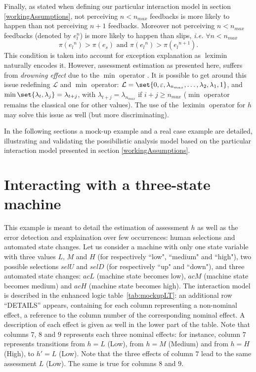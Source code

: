 Finally, as stated when defining our particular interaction model in
section \ref{workingAssumptions}, 
not perceiving  $n<n_{max}$ feedbacks is more likely to happen 
than not perceiving $n+1$ feedbacks. 
Moreover not perceiving $n<n_{max}$ feedbacks (denoted by $e_l^n$)
is more likely to happen than slips, 
\textit{i.e.} $\forall n<n_{max}$ %
\[ \pi({e_l}^n) > \pi(e_s) \mbox{ and } \pi({e_l}^n) > \pi({e_l}^{n+1}). \]
This condition is taken into account for exception explanation 
as $\operatorname*{leximin}$ naturally encodes it. 
However, assessment estimation as presented here, 
suffers from \textit{drowning effect} 
due to the $\min$ operator \cite{Dubois05b}.
It is possible to get around this issue 
redefining $\mathcal{L}$ and $\min$ operator: 
$\mathcal{L} = \set{ 0, \varepsilon, \lambda_{n_{max}},\ldots,\lambda_2, \lambda_1,1}$, 
and $\min \set{ \lambda_t, \lambda_j } = \lambda_{t+j} $, 
with $\lambda_{t+j} = \lambda_{n_{max}}$ 
if $i+j \geqslant n_{max}$ 
($\min$ operator remains the classical one for other values).
The use of the $\operatorname*{leximin}$ operator for $h$ may solve this issue as well 
(but more discriminating).

In the following sections a mock-up example 
and a real case example are detailed, 
illustrating and validating the
possibilistic analysis model based on
the particular interaction model presented in
section \ref{workingAssumptions}.

\section{Interacting with a three-state machine}
\label{sec:mockup}

This example is meant to detail the estimation of assessment $h$
as well as the error detection and explaination 
over few occurrences:
human selections and automated state changes. 
Let us consider a machine with only one state variable 
with three values $L$, $M$ and $H$ 
(for respectively ``low", ``medium" and ``high"), 
two possible selections $selU$ and $selD$ 
(for respectively ``up" and ``down"), 
and three automated state changes: 
$acL$ (machine state becomes low), 
$acM$ (machine state becomes medium) 
and $acH$ (machine state becomes high). 
The interaction model is described in the enhanced logic table~\ref{tab:mockupLT}: 
an additional row ``DETAILS'' appears, 
containing for each column representing
a non-nominal effect,
a reference to the column number of the corresponding nominal effect.
A description of each effect is given as well in the lower part of the table.
Note that columns $7$, $8$ and $9$ represents each three nominal effects:
for instance, column $7$ represents transitions from $h=L$ (Low), 
from $h=M$ (Medium) and from $h=H$ (High), to $h'=L$ (Low).
Note that the three effects of column $7$ lead 
to the same assessment $L$ (Low). The same is true for columns $8$ and $9$.

